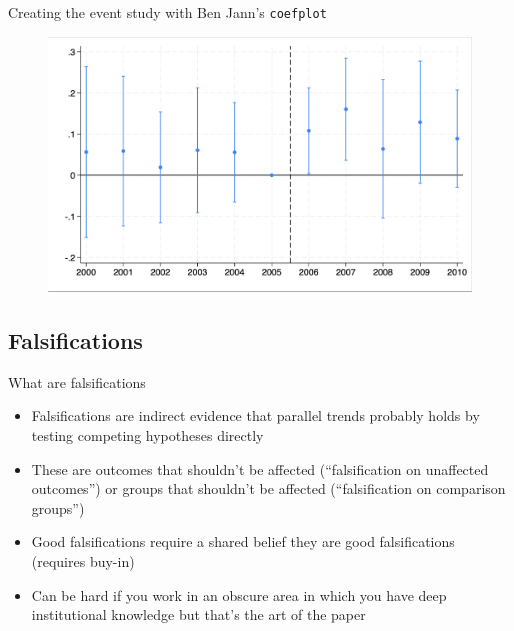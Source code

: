 \documentclass{beamer}
\begin{document}
\begin{frame}{Creating the event study with Ben Jann's \texttt{coefplot}}

	\begin{figure}
	\includegraphics[scale=0.20]{./lecture_includes/simple_eventstudy.png}
	\end{figure}

\end{frame}





\subsection{Falsifications}

\begin{frame}{What are falsifications}

\begin{itemize}
\item Falsifications are indirect evidence that parallel trends probably holds by testing competing hypotheses directly
\item These are outcomes that shouldn't be affected (``falsification on unaffected outcomes'') or groups that shouldn't be affected (``falsification on comparison groups'')
\item Good falsifications require a shared belief they are good falsifications (requires buy-in)
\item Can be hard if you work in an obscure area in which you have deep institutional knowledge but that's the art of the paper
\end{itemize}

\end{frame}
\end{document}
